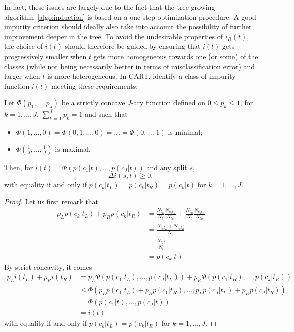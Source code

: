 In fact, these issues are largely due to the fact that the tree growing
algorithm~\ref{algo:induction} is based on a one-step optimization procedure. A
good impurity criterion should ideally also take into account the possibility
of further improvement deeper in the tree. To avoid the undesirable properties
of $i_R(t)$, the choice of $i(t)$ should therefore be
guided by ensuring that $i(t)$ gets progressively smaller when $t$ gets more
homogeneous towards one (or some) of the classes (while not being necessarily
better in terms of misclassification error) and larger when $t$ is more
heterogeneous. In CART, \citet{breiman:1984} identify a class of impurity
function $i(t)$ meeting these requirements:

\begin{theorem}\label{thm:reduction-impurity}
Let $\Phi(p_1, \dots, p_J)$ be a strictly concave $J$-ary function defined
on $0 \leq p_k \leq 1$, for $k=1,\dots,J$, $\sum_{k=1}^J p_k = 1$ and such that
\begin{itemize}
\item $\Phi(1, \dots, 0) = \Phi(0, 1, \dots, 0) = \dots = \Phi(0, \dots, 1)$ is minimal;
\item $\Phi(\frac{1}{J}, \dots, \frac{1}{J})$ is maximal.
\end{itemize}
Then, for $i(t) = \Phi(p(c_1|t), \dots, p(c_J|t))$ and any split $s$, $$\Delta i(s, t) \geq 0,$$
with equality if and only if $p(c_k|t_L)=p(c_k|t_R)=p(c_k|t)$ for $k=1,\dots,J$.
\end{theorem}

\begin{proof}
Let us first remark that
\begin{align*}
p_L p(c_k|t_L) + p_R p(c_k|t_R) &= \frac{N_{t_L}}{N_t} \frac{N_{c_kt_L}}{N_{t_L}} +  \frac{N_{t_R}}{N_t} \frac{N_{c_kt_R}}{N_{t_R}} \\
                                &= \frac{N_{c_kt_L} + N_{c_kt_R}}{N_t} \\
                                &= \frac{N_{c_kt}}{N_t} \\
                                &= p(c_k|t)
\end{align*}
By strict concavity, it comes
\begin{align*}
p_L i(t_L) + p_R i(t_R) &= p_L \Phi(p(c_1|t_L), \dots, p(c_J|t_L)) + p_R \Phi(p(c_1|t_R), \dots, p(c_J|t_R)) \\
                        &\leq \Phi(p_L p(c_1|t_L) + p_R p(c_1|t_R), \dots, p_L p(c_J|t_L) + p_R p(c_J|t_R)) \\
                        &= \Phi(p(c_1|t), \dots, p(c_J|t)) \\
                        &= i(t)
\end{align*}
with equality if and only
if $p(c_k|t_L)=p(c_k|t_R)$ for $k=1,\dots,J$.
\end{proof}

